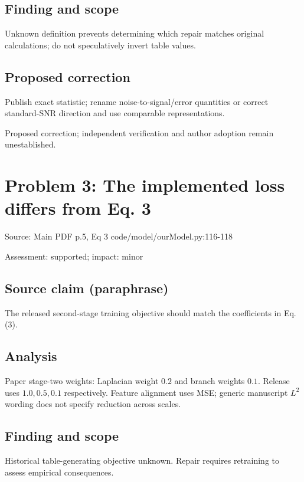 \documentclass[11pt]{article}
\begin{document}
\subsection*{Finding and scope}

Unknown definition prevents determining which repair matches original calculations; do not speculatively invert table values.

\subsection*{Proposed correction}

Publish exact statistic; rename noise-to-signal/error quantities or correct standard-SNR direction and use comparable representations.

Proposed correction; independent verification and author adoption remain unestablished.

\section*{Problem 3: The implemented loss differs from Eq. 3}

Source: Main PDF p.5, Eq 3 code/model/ourModel.py:116-118

Assessment: supported; impact: minor

\subsection*{Source claim (paraphrase)}

The released second-stage training objective should match the coefficients in Eq. (3).

\subsection*{Analysis}

Paper stage-two weights: Laplacian weight \(0.2\) and branch weights \(0.1\). Release uses \(1.0,0.5,0.1\) respectively. Feature alignment uses MSE; generic manuscript \(L^2\) wording does not specify reduction across scales.

\subsection*{Finding and scope}

Historical table-generating objective unknown. Repair requires retraining to assess empirical consequences.
\end{document}
